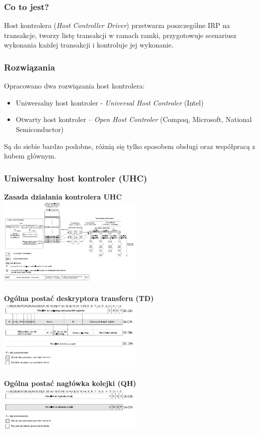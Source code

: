 	\subsubsection{Co to jest?}
	Host kontrolera (\emph{Host Controller Driver}) przetwarza poszczególne IRP na transakcje, tworzy listę transakcji  w ramach ramki, przygotowuje scenariusz wykonania każdej transakcji i kontroluje jej wykonanie.
	\subsubsection{Rozwiązania}
	Opracowano dwa rozwiązania host kontrolera:
	\begin{itemize}
		\item Uniwersalny host kontroler - \emph{Universal Host Controler} (Intel)
		\item Otwarty host kontroler – \emph{Open Host Controler} (Compaq, Microsoft, National Semiconductor)
	\end{itemize}
	Są do siebie bardzo podobne, różnią się tylko sposobem obsługi oraz współpracą z hubem głównym.
	\subsubsection{Uniwersalny host kontroler (UHC)}
	\textbf{Zasada działania kontrolera UHC}\\
	\includegraphics[width=7cm]{./wyklady/USB_46_1.pdf}\\\\
	\textbf{Ogólna postać deskryptora transferu (TD)}\\
	\includegraphics[width=7cm]{./wyklady/USB_47_1.pdf}\\\\
	\textbf{Ogólna postać nagłówka kolejki (QH)}\\
	\includegraphics[width=7cm]{./wyklady/USB_48_1.pdf}
